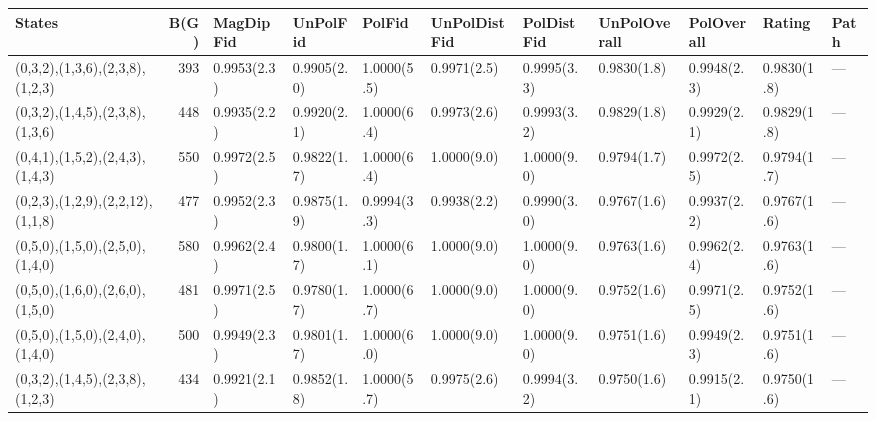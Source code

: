 \begin{tabular}{lrlllllllll}
\hline
 States                           &   B(G) & MagDipFid   & UnPolFid    & PolFid      & UnPolDistFid   & PolDistFid   & UnPolOverall   & PolOverall   & Rating      & Path   \\
\hline
 (0,3,2),(1,3,6),(2,3,8),(1,2,3)  &    393 & 0.9953(2.3) & 0.9905(2.0) & 1.0000(5.5) & 0.9971(2.5)    & 0.9995(3.3)  & 0.9830(1.8)    & 0.9948(2.3)  & 0.9830(1.8) & ---    \\
 (0,3,2),(1,4,5),(2,3,8),(1,3,6)  &    448 & 0.9935(2.2) & 0.9920(2.1) & 1.0000(6.4) & 0.9973(2.6)    & 0.9993(3.2)  & 0.9829(1.8)    & 0.9929(2.1)  & 0.9829(1.8) & ---    \\
 (0,4,1),(1,5,2),(2,4,3),(1,4,3)  &    550 & 0.9972(2.5) & 0.9822(1.7) & 1.0000(6.4) & 1.0000(9.0)    & 1.0000(9.0)  & 0.9794(1.7)    & 0.9972(2.5)  & 0.9794(1.7) & ---    \\
 (0,2,3),(1,2,9),(2,2,12),(1,1,8) &    477 & 0.9952(2.3) & 0.9875(1.9) & 0.9994(3.3) & 0.9938(2.2)    & 0.9990(3.0)  & 0.9767(1.6)    & 0.9937(2.2)  & 0.9767(1.6) & ---    \\
 (0,5,0),(1,5,0),(2,5,0),(1,4,0)  &    580 & 0.9962(2.4) & 0.9800(1.7) & 1.0000(6.1) & 1.0000(9.0)    & 1.0000(9.0)  & 0.9763(1.6)    & 0.9962(2.4)  & 0.9763(1.6) & ---    \\
 (0,5,0),(1,6,0),(2,6,0),(1,5,0)  &    481 & 0.9971(2.5) & 0.9780(1.7) & 1.0000(6.7) & 1.0000(9.0)    & 1.0000(9.0)  & 0.9752(1.6)    & 0.9971(2.5)  & 0.9752(1.6) & ---    \\
 (0,5,0),(1,5,0),(2,4,0),(1,4,0)  &    500 & 0.9949(2.3) & 0.9801(1.7) & 1.0000(6.0) & 1.0000(9.0)    & 1.0000(9.0)  & 0.9751(1.6)    & 0.9949(2.3)  & 0.9751(1.6) & ---    \\
 (0,3,2),(1,4,5),(2,3,8),(1,2,3)  &    434 & 0.9921(2.1) & 0.9852(1.8) & 1.0000(5.7) & 0.9975(2.6)    & 0.9994(3.2)  & 0.9750(1.6)    & 0.9915(2.1)  & 0.9750(1.6) & ---    \\
\hline
\end{tabular}